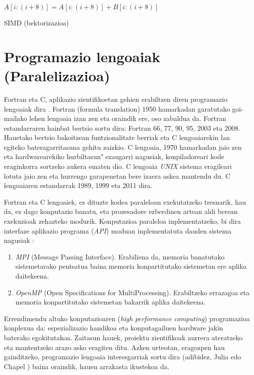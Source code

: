 \begin{algorithm}[H]
 \BlankLine
  {
   \BlankLine
    $A[i:(i+8)]=A[i:(i+8)]+B[i:(i+8)]$\;
   \BlankLine
  }
 \caption{SIMD (bektorizazioa)}
\end{algorithm}


\section{Programazio lengoaiak (Paralelizazioa)}

Fortran eta C, aplikazio zientifikoetan gehien erabiltzen diren programazio lengoaiak dira \cite{Higham2015}. Fortran (formula translation) 1950 hamarkadan garatutako goi-mailako lehen lengoaia izan zen eta oraindik ere, oso zabaldua da. Fortran estandarraren hainbat bertsio 
sortu dira: Fortran 66, 77, 90, 95, 2003 eta 2008. Hauetako bertsio bakoitzean funtzionalitate berriak  eta C lengoaiarekin lan egiteko bateragarritasuna gehitu zaizkio.  C lengoaia, 1970 hamarkadan jaio zen eta hardwarearekiko hurbiltasun" ezaugarri nagusiak, konpiladoreari kode eraginkorra sortzeko aukera ematen dio. C lengoaia \emph{UNIX} sistema eragileari lotuta jaio zen eta hurrengo garapenetan bere izaera askea mantendu du. C lengoaiaren estandarrak 1989, 1999 eta 2011 dira.   

Fortran eta C lengoaiek, ez dituzte kodea paraleloan exekutatzeko tresnarik, hau da, ez dago konputazio banatu, eta prozesadore ezberdinen artean aldi berean exekuzioak zehazteko modurik. Konputazioa paraleloa inplementatzeko, bi dira interfaze aplikazio programa (\emph{API}) moduan inplementatuta dauden sistema nagusiak \cite{Pacheco2011}:

\begin{enumerate}
\item  \emph{MPI} (Message Passing Interface).
Erabiliena da, memoria banatutako sistemetarako pentsatua baina memoria konpartitutako sistemetan ere aplika daitekeena.

\item  \emph{OpenMP} (Open Specifications for MultiProcessing).
Erabiltzeko errazagoa eta memoria konpartitutako sistemetan bakarrik aplika daitekeena.

\end{enumerate}

Errendimendu altuko konputazioaren (\emph{high performance computing}) programazioa konplexua da: espezializazio handikoa  eta konputagailuen hardware jakin baterako egokitutakoa. Zaitasun hauek, proiektu zientifikoak aurrera ateratzeko eta mantentzeko arazo asko eragiten ditu. Azken urteotan, eragozpen hau gainditzeko, programazio lengoaia interesgarriak sortu dira (adibidez, Julia \cite{Bezanson2014} edo Chapel \cite{Balaji2015}) baina oraindik, hauen arrakasta ikustekoa da.

